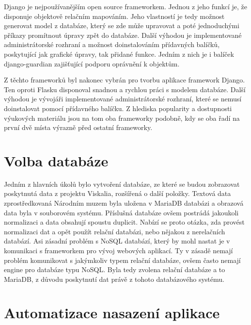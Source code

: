 Django je nejpoužívanějším open source frameworkem. Jednou z jeho funkcí je, že
disponuje objektově relačním mapováním. Jeho vlastností je tedy možnost generovat
model z databáze, který se zde může upravovat a poté jednoduchými
příkazy promítnout úpravy zpět do databáze. Další výhodou je implementované
administrátorské rozhraní a možnost doinstalováním přídavných balíčků,
poskytující jak grafické úpravy, tak přidané funkce. Jedním z nich je
i balíček django-guardian zajišťující podporu oprávnění k objektům. \cite{django}


Z těchto frameworků byl nakonec vybrán pro tvorbu aplikace framework
Django. Ten oproti Flasku disponoval snadnou a rychlou práci s modelem
databáze. Další výhodou je vývojáři implementované administrátorské
rozhraní, které se nemusí doinstalovat pomocí přídavného balíčku. Z
hlediska popularity a dostupnosti výuko\-vých materiálu jsou na tom oba
frameworky podobně, kdy se oba řadí na první dvě místa výrazně před
ostatní frameworky.

\vspace{10px}

\section{Volba databáze}

Jedním z hlavních úkolů bylo vytvoření databáze, ze které se budou
zobrazovat poskytnutá data z projektu Viskalia, rozšířená o další
položky. Textová data zpro\-středkovaná Národním muzem byla uložena v
MariaDB databázi a obrazová data byla v souborovém systému. Příslušná
databáze ovšem postrádá jakoukoli normalizaci a data obsahují spoustu
duplicit. Nabízí se proto otázka, zda provést normalizaci dat a opět
použít relační databázi, nebo nějakou z nerelačních
databází. Asi zásadní problém s NoSQL databází, který by mohl nastat
je v komunikaci s frameworkem pro vývoj webových aplikací. Ty
v zásadě nemají problém komunikovat s jakýmkoliv typem relační
databáze, ovšem často nemají engine pro databáze typu NoSQL. Byla 
tedy zvolena relační databáze a to MariaDB, z důvodu poskytnutí dat právě
z tohoto databázového systému. \cite{django} \cite{mariadb}

\newpage

\section{Automatizace nasazení aplikace}


